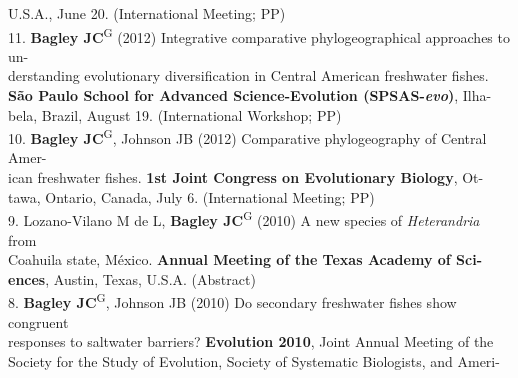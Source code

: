 \documentclass[margin,line]{res}
\begin{document}
\begin{resume}
\hspace*{8mm}U.S.A., June 20. (International Meeting; PP) \\
11. \textbf{Bagley JC}\textsuperscript{G} (2012) Integrative comparative phylogeographical approaches to un-\\
\hspace*{8mm} derstanding evolutionary diversification in Central American freshwater fishes.\\
\hspace*{8mm} \textbf{S\~{a}o Paulo School for Advanced Science-Evolution (SPSAS-\emph{evo})}, Ilha-\\ \vspace{2mm}
\hspace*{8mm}bela, Brazil, August 19. (International Workshop; PP) \\
10. \textbf{Bagley JC}\textsuperscript{G}, Johnson JB (2012) Comparative phylogeography of Central Amer-\\
\hspace*{8mm} ican freshwater fishes. \textbf{1st Joint Congress on Evolutionary Biology}, Ot-\\ \vspace{2mm}
\hspace*{8mm}tawa, Ontario, Canada, July 6. (International Meeting; PP) \\
9. Lozano-Vilano M de L, \textbf{Bagley JC}\textsuperscript{G} (2010) A new species of \emph{Heterandria} from\\
\hspace*{8mm} Coahuila state, M\'{e}xico. \textbf{Annual Meeting of the Texas Academy of Sci-}\\ \vspace{2mm}
\hspace*{8mm}\textbf{ences}, Austin, Texas, U.S.A. (Abstract) \\
8. \textbf{Bagley JC}\textsuperscript{G}, Johnson JB (2010) Do secondary freshwater fishes show congruent\\
\hspace*{8mm} responses to saltwater barriers? \textbf{Evolution 2010}, Joint Annual Meeting of the\\ 
\hspace*{8mm} Society for the Study of Evolution, Society of Systematic Biologists, and Ameri-\\

\end{resume}
\end{document}
